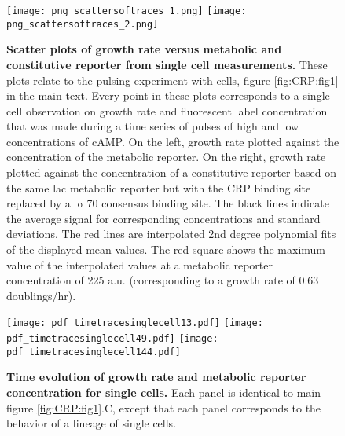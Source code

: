 \begin{figure}%
	\centering
	\texttt{[image: png\_scattersoftraces\_1.png]}
	\texttt{[image: png\_scattersoftraces\_2.png]}	
	\caption{ 
		\textbf{Scatter plots of growth rate versus metabolic and constitutive reporter from single cell measurements.}
        These plots relate to the pulsing experiment with \dcamp cells, figure \ref{fig:CRP:fig1} in the main text.
		Every point in these plots corresponds to a single cell observation on growth rate and fluorescent label concentration
        that was made during a time series of pulses of high and low concentrations of cAMP.
		On the left, growth rate plotted against the concentration of the metabolic reporter.
		On the right, growth rate plotted against the concentration of a constitutive reporter based on the same lac metabolic reporter but with the CRP binding site replaced by a $\upsigma$70 consensus binding site.
		The black lines indicate the average signal for corresponding concentrations and standard deviations.
		The red lines are interpolated 2nd degree polynomial fits of the displayed mean values.
		The red square shows the maximum value of the interpolated values at a metabolic reporter concentration of 225 a.u. (corresponding to a growth rate of 0.63 doublings/hr).
	}
	\label{fig:CRP:scatterspulsing}
\end{figure}%


\begin{figure}%
	\centering
	\texttt{[image: pdf\_timetracesinglecell13.pdf]}
	\texttt{[image: pdf\_timetracesinglecell49.pdf]}
	\texttt{[image: pdf\_timetracesinglecell144.pdf]}
    \caption{    
	\textbf{Time evolution of growth rate and metabolic reporter concentration for single cells.}
	Each panel is identical to main figure \ref{fig:CRP:fig1}.C, except that each panel corresponds to the behavior of a lineage of single cells.
}
\label{fig:CRP:timevolutionCRPgrowthsinglecell}
\end{figure}%



